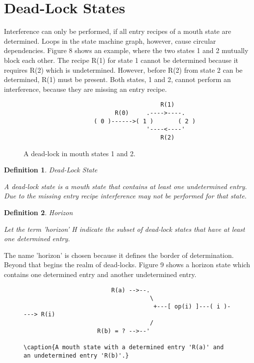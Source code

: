 \documentclass[12pt]{article}
\newtheorem{definition}{Definition}
\begin{document}
\section{Dead-Lock States}

Interference can only be performed, if all entry recipes of a mouth state are
determined. Loops in the state machine graph, however, cause circular
dependencies.  Figure 8 shows an example, where the two states 1 and 2 mutually
block each other. The recipe R(1) for state 1 cannot be determined because it
requires R(2) which is undetermined. However, before R(2) from state 2 can be
determined, R(1) must be present. Both states, 1 and 2, cannot perform an
interference, because they are missing an entry recipe. 

\begin{figure}[htbp] \leavevmode
\begin{verbatim}
                                       R(1)
                          R(0)     .---->----.
                    ( 0 )------>( 1 )       ( 2 )
                                   '----<----'
                                       R(2)

\end{verbatim}
\caption{A dead-lock in mouth states 1 and 2.}
\end{figure}

\begin{definition}
    
Dead-Lock State

A dead-lock state is a mouth state that contains at least one undetermined
entry. Due to the missing entry recipe interference may not be performed
for that state.
\end{definition}

\begin{definition}
Horizon

Let the term 'horizon' H indicate the subset of dead-lock states that have
at least one determined entry.
\end{definition}

The name 'horizon' is chosen because it defines the border of determination.
Beyond that begins the realm of dead-locks. Figure 9 shows a horizon state
which contains one determined entry and another undetermined entry.

\begin{figure}[htbp] \leavevmode
\begin{verbatim}
                         R(a) -->--.
                                    \
                                     +---[ op(i) ]---( i )----> R(i)
                                    /
                     R(b) = ? -->--'

\caption{A mouth state with a determined entry 'R(a)' and 
an undetermined entry 'R(b)'.}
\end{verbatim}
\end{figure}
\end{document}
